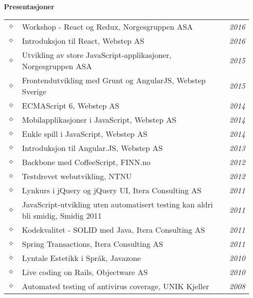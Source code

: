 \documentclass[overlapped,line,letterpaper]{res}
\begin{document}
\begin{resume}
\begin{tabularx}{\textwidth}{lXr}
\end{tabularx}

\section{}
\textbf{Presentasjoner}\\
\makebox[\textwidth]{\hrulefill}

\begin{tabularx}{\textwidth}{lXr}
$\diamond$	& Workshop - React og Redux, Norgesgruppen ASA & \textit{2016} \\
$\diamond$	& Introduksjon til React, Webstep AS & \textit{2016} \\
$\diamond$	& Utvikling av store JavaScript-applikasjoner, Norgesgruppen ASA & \textit{2015} \\
$\diamond$	& Frontendutvikling med Grunt og AngularJS, Webstep Sverige & \textit{2015} \\
$\diamond$	& ECMAScript 6, Webstep AS & \textit{2014} \\
$\diamond$	& Mobilapplikasjoner i JavaScript, Webstep AS & \textit{2014} \\
$\diamond$	& Enkle spill i JavaScript, Webstep AS & \textit{2014} \\
$\diamond$	& Introduksjon til Angular.JS, Webstep AS & \textit{2013} \\
$\diamond$	& Backbone med CoffeeScript, FINN.no & \textit{2012} \\
$\diamond$	& Testdrevet webutvikling, NTNU & \textit{2012} \\
$\diamond$	& Lynkurs i jQuery og jQuery UI, Itera Consulting AS & \textit{2011} \\
$\diamond$	& JavaScript-utvikling uten automatisert testing kan aldri bli smidig, Smidig 2011 & \textit{2011} \\
$\diamond$	& Kodekvalitet - SOLID med Java, Itera Consulting AS & \textit{2011} \\
$\diamond$	& Spring Transactions, Itera Consulting AS & \textit{2011} \\
$\diamond$	& Lyntale Estetikk i Språk, Javazone & \textit{2010} \\
$\diamond$	& Live coding on Rails, Objectware AS & \textit{2010} \\
$\diamond$	& Automated testing of antivirus coverage, UNIK Kjeller & \textit{2008} \\
\end{tabularx}



\end{resume}
\end{document}
